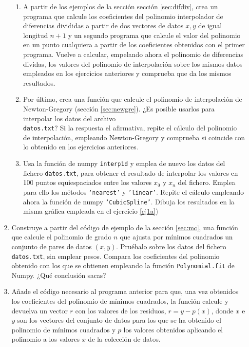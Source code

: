 \begin{paracol}{2}
\begin{enumerate}
\begin{enumerate}
\item A partir de los ejemplos de la sección  sección \ref{sec:difdiv}, crea un programa que calcule los coeficientes del polinomio interpolador de diferencias divididas a partir de dos vectores de datos  $x,y$ de igual longitud $n+1$ y un segundo programa que calcule el valor del polinomio en un punto cualquiera a partir de los coeficientes obtenidos con el primer programa. Vuelve a calcular, empelando ahora el polinomio de diferencias dividas, los valores del polinomio de interpolación sobre los mismos datos empleados en los ejercicios anteriores y comprueba que da los mismos resultados.

\item Por último, crea una función que calcule el polinomio de interpolación de Newton-Gregory (sección \ref{sec:newgre}). ¿Es posible usarlos para interpolar los datos del archivo\\ \texttt{datos.txt}? Si la respuesta el afirmativa, repite el cálculo del polinomio de interpolación, empleando Newton-Gregory y comprueba si coincide con lo obtenido en los ejercicios anteriores.

\item Usa la función de numpy \texttt{interp1d} y emplea de nuevo los datos del fichero \texttt{datos.txt}, para obtener el resultado de interpolar los valores en 100 puntos equiespaciados entre los valores $x_0$ y $x_{n}$ del fichero.  Emplea para ello los métodos \texttt{'nearest'} y \texttt{'linear'}. Repite el cálculo empleando ahora la función de numpy  \texttt{'CubicSpline'}. Dibuja los resultados en la misma gráfica empleada en el ejercicio  \ref{ej1a})
\end{enumerate}
\item Construye a partir del código de ejemplo de la sección \ref{sec:mc}, una función que calcule el polinomio de grado $n$ que ajusta por mínimos cuadrados un conjunto de pares de datos $(x, y)$. Pruébalo sobre los datos del fichero \texttt{datos.txt}, sin emplear pesos. Compara los coeficientes del polinomio obtenido con los que se obtienen empleando la función \texttt{Polynomial.fit} de Numpy. ¿Qué conclusión sacas?

\item Añade el código necesario al programa anterior para que, una vez obtenidos los coeficientes del polinomio de mínimos cuadrados, la función calcule y devuelva un vector $r$ con los valores de los residuos, $r = y -p(x)$, donde $x$ e $y$ son los vectores del conjunto de datos para los que se ha obtenido el polinomio de mínimos cuadrados y $p$ los valores obtenidos aplicando el polinomio a los valores $x$ de la colección de datos.
\end{enumerate}
\switchcolumn

\end{paracol}

